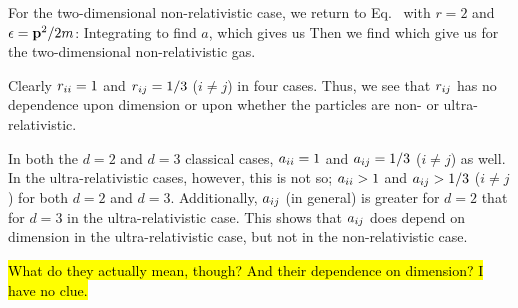 {	For the two-dimensional non-relativistic case, we return to Eq.~ with $r=2$ and $\epsilon = \vb{p}^2/2m$:
	Integrating to find $a$,
	which gives us
	Then we find
	which give us
	for the two-dimensional non-relativistic gas.
	
	Clearly $r_{ii} = 1$ and $r_{ij} = 1/3$ ($i \neq j$) in four cases.  Thus, we see that $r_{ij}$ has no dependence upon dimension or upon whether the particles are non- or ultra-relativistic.
	
	In both the $d = 2$ and $d = 3$ classical cases, $a_{ii} = 1$ and $a_{ij} = 1/3$ ($i \neq j$) as well.  In the ultra-relativistic cases, however, this is not so; $a_{ii} > 1$ and $a_{ij} > 1/3$ ($i \neq j$) for both $d = 2$ and $d = 3$.  Additionally, $a_{ij}$ (in general) is greater for $d = 2$ that for $d = 3$ in the ultra-relativistic case.  This shows that $a_{ij}$ does depend on dimension in the ultra-relativistic case, but not in the non-relativistic case.
	
	\hl{What do they actually mean, though?  And their dependence on dimension?  I have no clue.}
}